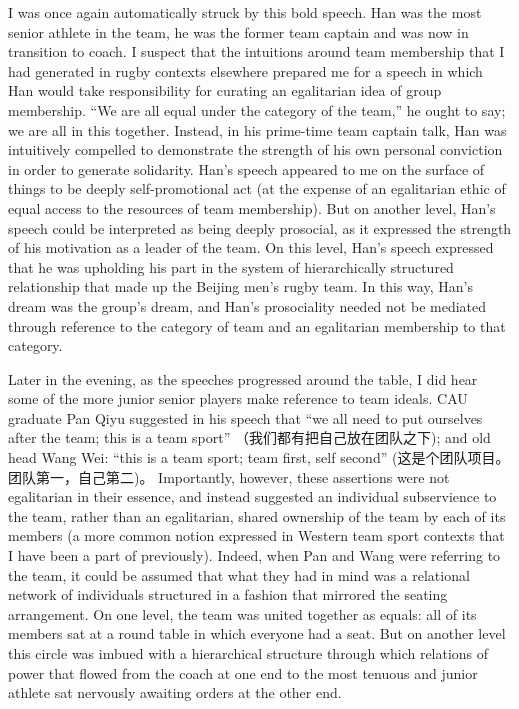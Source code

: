   I was once again automatically struck by this bold speech.  Han was the most senior athlete in the team, he was the former team captain and was now in transition to coach.  I suspect that the intuitions around team membership that I had generated in rugby contexts elsewhere prepared me for a speech in which Han would take responsibility for curating an egalitarian idea of group membership.  ``We are all equal under the category of the team,'' he ought to say; we are all in this together.   Instead, in his prime-time team captain talk, Han was intuitively compelled to demonstrate the strength of his own personal conviction in order to generate solidarity. Han's speech appeared to me on the surface of things to be deeply self-promotional act (at the expense of an egalitarian ethic of equal access to the resources of team membership). But on another level, Han's speech could be interpreted as being deeply prosocial, as it expressed the strength of his motivation as a leader of the team. On this level, Han's speech expressed that he was upholding his part in the system of hierarchically structured relationship that made up the Beijing men's rugby team.  In this way, Han's dream was the group's dream, and Han's prosociality needed not be mediated through reference to the category of team and an egalitarian membership to that category.

  Later in the evening, as the speeches progressed around the table, I did hear some of the more junior senior players make reference to team ideals.   CAU graduate Pan Qiyu suggested in his speech that ``we all need to put ourselves after the team; this is a team sport'' （我们都有把自己放在团队之下); and old head Wang Wei: ``this is a team sport; team first, self second'' (这是个团队项目。团队第一，自己第二)。 Importantly, however, these assertions were not egalitarian in their essence, and instead suggested an individual subservience to the team, rather than an egalitarian, shared ownership of the team by each of its members (a more common notion expressed in Western team sport contexts that I have been a part of previously).  Indeed, when Pan and Wang were referring to the team, it could be assumed that what they had in mind was a relational network of individuals structured in a fashion that mirrored the seating arrangement. On one level, the team was united together as equals: all of its members sat at a round table in which everyone had a seat. But on another level this circle was imbued with a hierarchical structure through which relations of power that flowed from the coach at one end to the most tenuous and junior athlete sat nervously awaiting orders at the other end.

